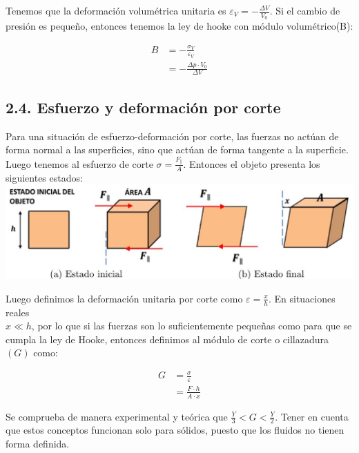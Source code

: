 \documentclass[10pt]{article}
\begin{document}
Tenemos que la deformación volumétrica unitaria es $\varepsilon_{V}=-\frac{\Delta V}{V_{0}}$. Si el cambio de presión es pequeño, entonces tenemos la ley de hooke con módulo volumétrico(B):

$$
\begin{aligned}
B & =-\frac{\sigma_{V}}{\varepsilon_{V}} \\
& =-\frac{\Delta p \cdot V_{0}}{\Delta V}
\end{aligned}
$$

\subsection*{2.4. Esfuerzo y deformación por corte}
Para una situación de esfuerzo-deformación por corte, las fuerzas no actúan de forma normal a las superficies, sino que actúan de forma tangente a la superficie. Luego tenemos al esfuerzo de corte $\sigma=\frac{F_{\|}}{A}$. Entonces el objeto presenta los siguientes estados:\\
\includegraphics[max width=\textwidth, center]{2025_04_28_a9941da8947ada55c6c9g-05(1)}

Luego definimos la deformación unitaria por corte como $\varepsilon=\frac{x}{h}$. En situaciones reales\\
$x \ll h$, por lo que si las fuerzas son lo suficientemente pequeñas como para que se cumpla la ley de Hooke, entonces definimos al módulo de corte o cillazadura $(G)$ como:

$$
\begin{aligned}
G & =\frac{\sigma}{\varepsilon} \\
& =\frac{F \cdot h}{A \cdot x}
\end{aligned}
$$

Se comprueba de manera experimental y teórica que $\frac{Y}{3}<G<\frac{Y}{2}$. Tener en cuenta que estos conceptos funcionan solo para sólidos, puesto que los fluidos no tienen forma definida.
\end{document}
